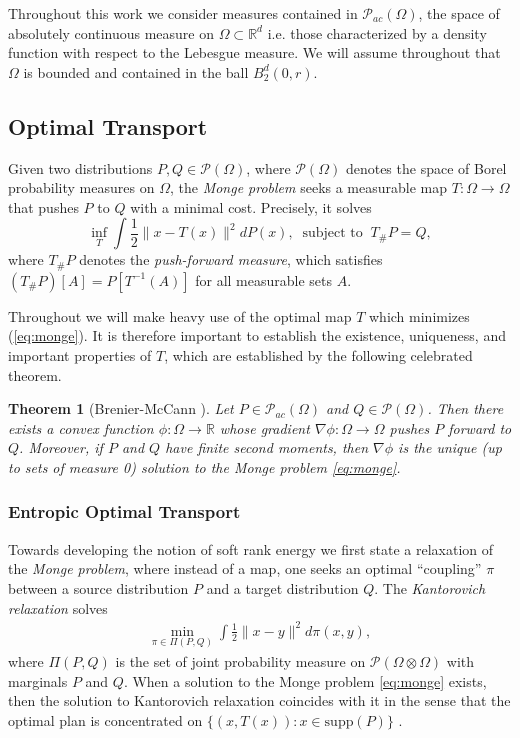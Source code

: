 \documentclass{article}
\newtheorem{theorem}{Theorem}
\theoremstyle{definition}
\begin{document}
Throughout this work we consider measures contained in $\mathcal P_{ac}(\Omega)$, the space of absolutely continuous measure on $\Omega \subset \mathbb{R}^d$  i.e. those characterized by a density function with respect to the Lebesgue measure. We will assume throughout that $\Omega$ is bounded and contained in the ball $B_2^d(0,r)$.
\subsection{Optimal Transport}
Given two distributions $P, Q\in \mathcal P(\Omega)$, where $\mathcal P(\Omega)$ denotes the space of Borel probability measures on $\Omega$, the \emph{Monge problem} \cite{monge1781memoire} seeks a measurable map $T: \Omega \rightarrow \Omega$ that pushes $P$ to $Q$ with a minimal cost.  Precisely, it solves
\begin{equation}\label{eq:monge}
     \inf_{T}\int \frac{1}{2}\|x- T(x)\|^2 dP(x),\;\; \text{subject to}\;\;  T_\#P= Q,
\end{equation}
where $T_\#P$ denotes the \textit{push-forward measure}, which satisfies $(T_\#P)[A] = P[T^{-1}(A)]$ for all measurable sets $A$.  

Throughout we will make heavy use of the optimal map $T$ which minimizes (\ref{eq:monge}). It is therefore important to establish the existence, uniqueness, and important properties of $T$, which are established by the following celebrated theorem.
\begin{theorem}[Brenier-McCann \cite{mccann1995existence, brenier1991polar}]\label{th:mccann}
    Let $P\in \mathcal P_{ac}(\Omega)$ and $Q\in \mathcal P(\Omega)$. Then there exists a convex function $\phi:\Omega\rightarrow \mathbb R$ whose gradient $\nabla \phi:\Omega\rightarrow \Omega$ pushes $P$ forward to $Q$.  Moreover, if $P$ and $Q$ have finite second moments, then $\nabla \phi$ is the unique (up to sets of measure 0) solution to the Monge problem \eqref{eq:monge}.
\end{theorem}
\subsubsection{Entropic Optimal Transport}
Towards developing the notion of soft rank energy we first state a relaxation of the \emph{Monge problem}, where instead of a map, one seeks an optimal ``coupling'' $\pi$ between a source distribution $P$ and a target distribution $Q$. The \emph{Kantorovich relaxation} \cite{OTAM} solves 
\begin{align}\label{eq:kantoro_OT}
    \min_{\pi\in \Pi(P, Q)}\int \frac{1}{2}\| x -  y \|^2 d\pi( x, y),
\end{align}
where $\Pi(P, Q)$ is the set of joint probability measure on $\mathcal P (\Omega \otimes \Omega)$ with marginals $P$ and $Q$. When a solution to the Monge problem \ref{eq:monge} exists, then the solution to Kantorovich relaxation coincides with it in the sense that the optimal plan is concentrated on $\{(x, T(x)) : x\in \text{supp}(P)\}$ \cite{OTAM}. 
\end{document}
